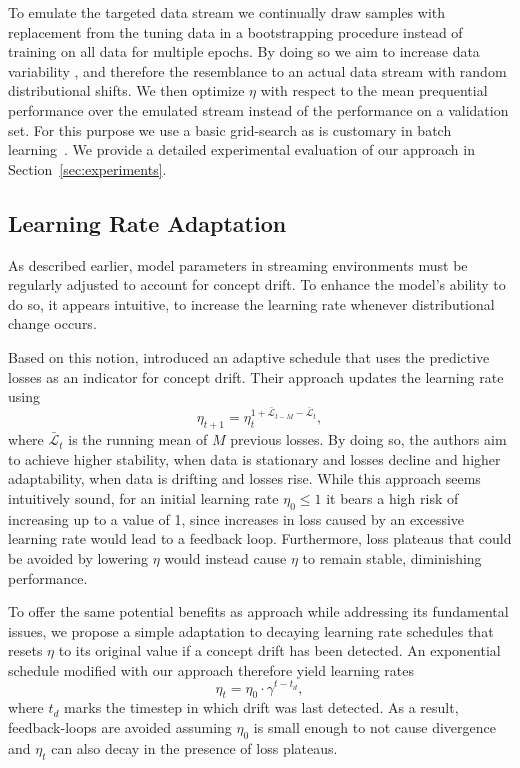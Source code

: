 \documentclass[letterpaper]{article} %
\begin{document}
To emulate
the targeted data stream we continually draw samples with replacement from the tuning data in a bootstrapping procedure instead of training on all data for multiple epochs.
By doing so we aim to increase data variability%
, and therefore the resemblance to an actual data stream with random distributional shifts.
We then optimize $\eta$ with respect to the mean prequential performance over the emulated stream instead of the performance on a validation set.
For this purpose we use a basic grid-search as is customary in batch learning~\cite{defazioLearningRateFreeLearningDAdaptation2023a}.
We provide a detailed experimental evaluation of our approach in Section~\ref{sec:experiments}.

\subsection{Learning Rate Adaptation}

As described earlier, model parameters in streaming environments must be regularly adjusted to account for concept drift.
To enhance the model's ability to do so, it appears intuitive, to increase the learning rate whenever distributional change occurs.

Based on this notion, \citet{kunchevaAdaptiveLearningRate2008} introduced an adaptive schedule that uses the predictive losses as an indicator for concept drift.
Their approach updates the learning rate using
\begin{equation}
	\eta_{t+1} = \eta_t^{1+	\bar{\mathcal{L}}_{t-M} - \bar{\mathcal{L}}_{t}},
\end{equation}\label{eq:kuncheva_lr}
where $\bar{\mathcal{L}}_{t}$ is the running mean of $M$ previous losses.
By doing so, the authors aim to achieve higher stability, when data is stationary and losses decline and higher adaptability, when data is drifting and losses rise.
While this approach seems intuitively sound, for an initial learning rate $\eta_0 \leq 1$ it bears a high risk of increasing up to a value of 1, since increases in loss caused by an excessive learning rate would lead to a feedback loop.
Furthermore, loss plateaus that could be avoided by lowering $\eta$ would instead cause $\eta$ to remain stable, diminishing performance.

To offer the same potential benefits as \citet{kunchevaAdaptiveLearningRate2008} approach while addressing its fundamental issues, we propose a simple adaptation to decaying learning rate schedules that resets $\eta$ to its original value if a concept drift has been detected.
An exponential schedule modified with our approach therefore yield learning rates
\begin{equation}
	\eta_t = \eta_0 \cdot \gamma^{t-t_d},
\end{equation}\label{eq:drift_reset}
where $t_d$ marks the timestep in which drift was last detected.
As a result, feedback-loops are avoided assuming $\eta_0$ is small enough to not cause divergence and $\eta_t$ can also decay in the presence of loss plateaus.
\end{document}
